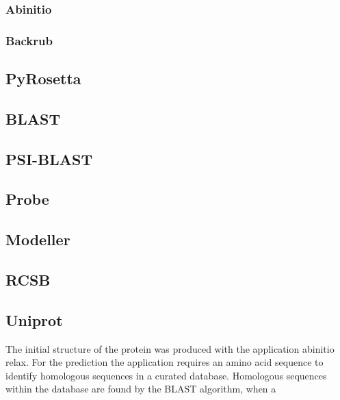 \subsubsection{Abinitio}
\label{subsubsec:MM_Abinitio}

\subsubsection{Backrub}
\label{subsubsec:MM_Backrub}

\label{subsec:MM_Rosetta}

\subsection{PyRosetta}
\label{subsec:MM_PyRosetta}

\subsection{BLAST}
\label{subsec:MM_BLAST}

\subsection{PSI-BLAST}
\label{subsec:MM_PSI_BLAST}

\subsection{Probe}
\label{subsec:MM_Probe}

\subsection{Modeller}
\label{subsec:MM_Modeller}

\subsection{RCSB}
\label{subsec:MM_RCSB}

\subsection{Uniprot}
\label{subsec:MM_Uniprot}




 The initial structure of the protein was produced with the application abinitio relax. For the prediction the application requires an amino acid sequence to identify homologous sequences in a curated database. Homologous sequences within the database are found by the BLAST algorithm, when a

